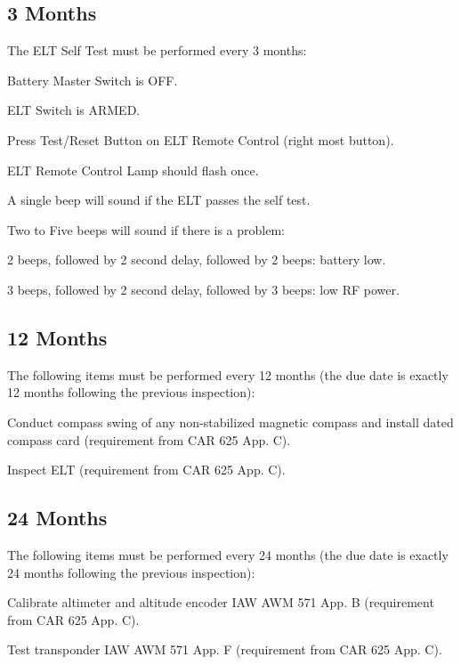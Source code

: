 \subsection{3 Months} The ELT Self Test must be performed every 3 months:
\begin{enumerate*}
	\item Battery Master Switch is OFF.
	\item ELT Switch is ARMED.
	\item Press Test/Reset Button on ELT Remote Control (right most button).
	\item ELT Remote Control Lamp should flash once.
	\item A single beep will sound if the ELT passes the self test.
	\item Two to Five beeps will sound if there is a problem:
	\begin{enumerate*}
	  \item 2 beeps, followed by 2 second delay, followed by 2 beeps: battery low.
	  \item 3 beeps, followed by 2 second delay, followed by 3 beeps: low RF power.
	  \end{enumerate*}
\end{enumerate*}

\subsection{12 Months} The following items must be performed every 12 months (the due date is exactly 12 months following the previous inspection):
\begin{enumerate*}
	\item Conduct compass swing of any non-stabilized magnetic compass and install dated compass card (requirement from CAR 625 App. C).
	\item Inspect ELT (requirement from CAR 625 App. C).
\end{enumerate*}

\subsection{24 Months} The following items must be performed every 24 months (the due date is exactly 24 months following the previous inspection):
\begin{enumerate*}
	\item Calibrate altimeter and altitude encoder IAW AWM 571 App. B (requirement from CAR 625 App. C).
	\item Test transponder IAW AWM 571 App. F (requirement from CAR 625 App. C).
\end{enumerate*}


